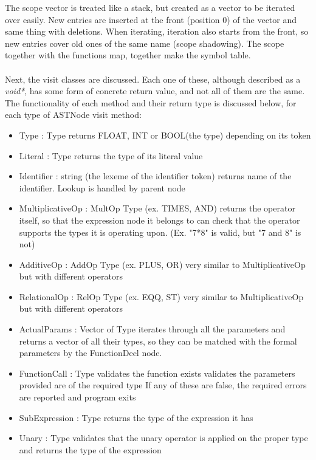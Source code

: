 The scope vector is treated like a stack, but created as a vector to be iterated over easily. New entries are inserted at the front (position 0) of the vector and same thing with deletions. When iterating, iteration also starts from the front, so new entries cover old ones of the same name (scope shadowing). The scope together with the functions map, together make the symbol table.
\\\\
Next, the visit classes are discussed. Each one of these, although described as a \textit{void*}, has some form of concrete return value, and not all of them are the same. The functionality of each method and their return type is discussed below, for each type of ASTNode visit method:
\begin{itemize}
	\item Type : Type 
		\subitem returns FLOAT, INT or BOOL(the type) depending on its token
	\item Literal : Type
		\subitem returns the type of its literal value
	\item Identifier : string (the lexeme of the identifier token)
		\subitem returns name of the identifier. Lookup is handled by parent node
	\item MultiplicativeOp : MultOp Type (ex. TIMES, AND)
		\subitem returns the operator itself, so that the expression node it belongs to can check that the operator supports the types it is operating upon. (Ex. "7*8" is valid, but "7 and 8" is not)
	\item AdditiveOp : AddOp Type (ex. PLUS, OR)
		\subitem very similar to MultiplicativeOp but with different operators
	\item RelationalOp : RelOp Type (ex. EQQ, ST)
		\subitem very similar to MultiplicativeOp but with different operators
	\item ActualParams : Vector of Type
		\subitem iterates through all the parameters and returns a vector of all their types, so they can be matched with the formal parameters by the FunctionDecl node.
	\item FunctionCall : Type
		\subitem validates the function exists
		\subitem validates the parameters provided are of the required type
		\subitem If any of these are false, the required errors are reported and program exits
	\item SubExpression : Type
		\subitem returns the type of the expression it has
	\item Unary : Type
		\subitem validates that the unary operator is applied on the proper type and returns the type of the expression

\end{itemize}
